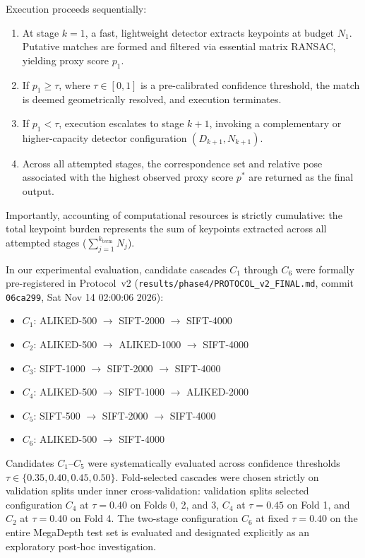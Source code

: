 \documentclass[conference]{IEEEtran}
\begin{document}
Execution proceeds sequentially:
\begin{enumerate}
    \item At stage $k=1$, a fast, lightweight detector extracts keypoints at budget $N_1$. Putative matches are formed and filtered via essential matrix RANSAC, yielding proxy score $p_1$.
    \item If $p_1 \ge \tau$, where $\tau \in [0, 1]$ is a pre-calibrated confidence threshold, the match is deemed geometrically resolved, and execution terminates.
    \item If $p_1 < \tau$, execution escalates to stage $k+1$, invoking a complementary or higher-capacity detector configuration $(D_{k+1}, N_{k+1})$.
    \item Across all attempted stages, the correspondence set and relative pose associated with the highest observed proxy score $p^*$ are returned as the final output.
\end{enumerate}

Importantly, accounting of computational resources is strictly cumulative: the total keypoint burden represents the sum of keypoints extracted across all attempted stages ($\sum_{j=1}^{k_{\text{term}}} N_j$).

In our experimental evaluation, candidate cascades $C_1$ through $C_6$ were formally pre-registered in Protocol~v2 (\texttt{results/phase4/PROTOCOL\_v2\_FINAL.md}, commit \texttt{06ca299}, Sat Nov 14 02:00:06 2026):
\begin{itemize}
    \item $C_1$: ALIKED-500 $\to$ SIFT-2000 $\to$ SIFT-4000
    \item $C_2$: ALIKED-500 $\to$ ALIKED-1000 $\to$ SIFT-4000
    \item $C_3$: SIFT-1000 $\to$ SIFT-2000 $\to$ SIFT-4000
    \item $C_4$: ALIKED-500 $\to$ SIFT-1000 $\to$ ALIKED-2000
    \item $C_5$: SIFT-500 $\to$ SIFT-2000 $\to$ SIFT-4000
    \item $C_6$: ALIKED-500 $\to$ SIFT-4000
\end{itemize}
Candidates $C_1$--$C_5$ were systematically evaluated across confidence thresholds $\tau \in \{0.35, 0.40, 0.45, 0.50\}$. Fold-selected cascades were chosen strictly on validation splits under inner cross-validation: validation splits selected configuration $C_4$ at $\tau = 0.40$ on Folds 0, 2, and 3, $C_4$ at $\tau = 0.45$ on Fold 1, and $C_2$ at $\tau = 0.40$ on Fold 4. The two-stage configuration $C_6$ at fixed $\tau = 0.40$ on the entire MegaDepth test set is evaluated and designated explicitly as an exploratory post-hoc investigation.
\end{document}
